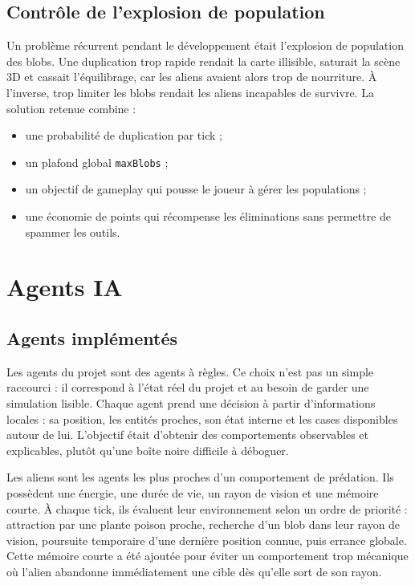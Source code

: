 ﻿\documentclass[11pt,a4paper]{article}
\begin{document}
\subsection{Contrôle de l'explosion de population}

Un problème récurrent pendant le développement était l'explosion de population des blobs. Une duplication trop rapide rendait la carte illisible, saturait la scène 3D et cassait l'équilibrage, car les aliens avaient alors trop de nourriture. À l'inverse, trop limiter les blobs rendait les aliens incapables de survivre. La solution retenue combine :

\begin{itemize}[noitemsep]
  \item une probabilité de duplication par tick ;
  \item un plafond global \texttt{maxBlobs} ;
  \item un objectif de gameplay qui pousse le joueur à gérer les populations ;
  \item une économie de points qui récompense les éliminations sans permettre de spammer les outils.
\end{itemize}

\section{Agents IA}

\subsection{Agents implémentés}

Les agents du projet sont des agents à règles. Ce choix n'est pas un simple raccourci : il correspond à l'état réel du projet et au besoin de garder une simulation lisible. Chaque agent prend une décision à partir d'informations locales : sa position, les entités proches, son état interne et les cases disponibles autour de lui. L'objectif était d'obtenir des comportements observables et explicables, plutôt qu'une boîte noire difficile à déboguer.

Les aliens sont les agents les plus proches d'un comportement de prédation. Ils possèdent une énergie, une durée de vie, un rayon de vision et une mémoire courte. À chaque tick, ils évaluent leur environnement selon un ordre de priorité : attraction par une plante poison proche, recherche d'un blob dans leur rayon de vision, poursuite temporaire d'une dernière position connue, puis errance globale. Cette mémoire courte a été ajoutée pour éviter un comportement trop mécanique où l'alien abandonne immédiatement une cible dès qu'elle sort de son rayon.
\end{document}
